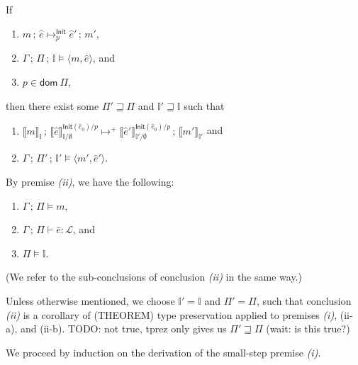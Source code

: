 \documentclass{article}
\newcommand{\mf}[1]{\mathsf{#1}}
\newcommand{\mc}[1]{\mathcal{#1}}
\newcommand{\semi}{\,;\,}
\newcommand{\dom}{\mf{dom}}
\newcommand{\rpo}{\sqsupseteq}
\newcommand{\hl}[1]{\colorbox{LightGoldenrod1}{#1}}
\newcommand{\llrr}[1]{\llbracket #1 \rrbracket}
\newcommand{\pair}[2]{\langle #1, #2 \rangle}
\newcommand{\Ell}{\mc{L}}
\newcommand{\I}{\mathbb{I}}
\begin{document}
\begin{theorem}
If \begin{enumerate}[label=(\roman*)]
\item $m \semi \hat{e} \mapsto^\mf{Init}_p \hat{e}' \semi m'$,
\item $\Gamma \semi \Pi \semi \I \vDash \pair{m}{\hat{e}}$, and
\item $p \in \dom\ \Pi$,
\end{enumerate}
then there exist some $\Pi' \rpo \Pi$ and $\I' \rpo \I$ such that
\begin{enumerate}[label=(\roman*)]
\item $\llrr{m}_\I \semi \llrr{\hat{e}}^{\mf{Init}(\hat{e}_0)/p}_{\I/\emptyset} 
\mapsto^+ \llrr{\hat{e}'}^{\mf{Init}(\hat{e}_0)/p}_{\I'/\emptyset} 
\semi \llrr{m'}_{\I'}$ and
\item $\Gamma \semi \Pi' \semi \I' \vDash \pair{m'}{\hat{e}'}$.
\end{enumerate}

\begin{Proof}
By premise \emph{(ii)}, we have the following:
\begin{enumerate}[label=(ii-\alph*)]
\item $\Gamma \semi \Pi \vDash m$,
\item $\Gamma \semi \Pi \vdash \hat{e}: \Ell$, and
\item $\Pi \vDash \I$.
\end{enumerate}
(We refer to the sub-conclusions of conclusion \emph{(ii)} in the same way.)

Unless otherwise mentioned, we choose $\I'=\I$ and $\Pi'=\Pi$,
such that conclusion \emph{(ii)}
is a corollary of (\hl{THEOREM}) type preservation
applied to premises \emph{(i)}, (ii-a), and (ii-b).
\hl{TODO}: not true, tprez only gives us $\Pi' \rpo \Pi$
(wait: is this true?)

We proceed by induction on the derivation 
of the small-step premise \emph{(i)}.


\end{Proof}
\end{theorem}
\end{document}
